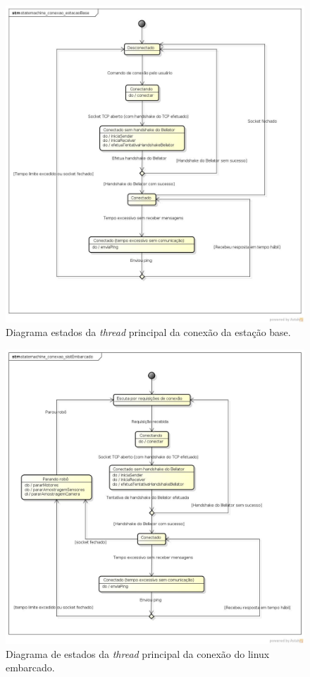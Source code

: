\begin{figure}[H]
  \centering
  \includegraphics[width=\textwidth, keepaspectratio]{./figuras/estacaoBase/statemachine_conexao_estacaoBase.jpg}
  \caption{Diagrama estados da \textit{thread} principal da conexão da estação base.}
  \label{fig:diagrama_estados_estacao_base}
\end{figure}

\begin{figure}[H]
  \centering
  \includegraphics[width=\textwidth, keepaspectratio]{./figuras/sistEmbarcado/statemachine_conexao_sistEmbarcado.jpg}
  \caption{Diagrama de estados da \textit{thread} principal da conexão do linux embarcado.}
  \label{fig:diagrama_estados_sist_embarcado}
\end{figure}

